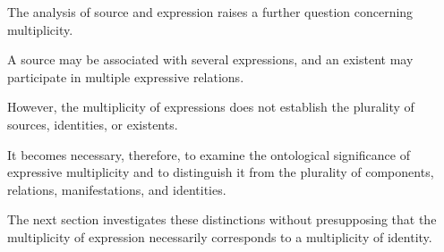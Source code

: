 The analysis of source and expression raises
a further question concerning multiplicity.

A source may be associated with several expressions,
and an existent may participate in multiple
expressive relations.

However, the multiplicity of expressions does
not establish the plurality of sources, identities,
or existents.

It becomes necessary, therefore, to examine
the ontological significance of expressive
multiplicity and to distinguish it from the
plurality of components, relations, manifestations,
and identities.

The next section investigates these distinctions
without presupposing that the multiplicity
of expression necessarily corresponds to
a multiplicity of identity.

